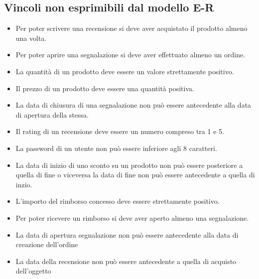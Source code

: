 \subsection{Vincoli non esprimibili dal modello E-R}

\begin{itemize}
    \item Per poter scrivere una recensione si deve aver acquistato il prodotto almeno una volta. 
    \item Per poter aprire una segnalazione si deve aver effettuato almeno un ordine.
    \item La quantità di un prodotto deve essere un valore strettamente positivo.
    \item Il prezzo di un prodotto deve essere una quantità positiva.
    \item La data di chiusura di una segnalazione non può essere antecedente alla data di apertura della stessa.
    \item Il rating di un recensione deve essere un numero compreso tra 1 e 5.
    \item La password di un utente non può essere inferiore agli 8 caratteri.
    \item La data di inizio di uno sconto su un prodotto non può essere posteriore a quella di fine o viceversa la data di fine non può essere antecedente a quella di inzio.
    \item L'importo del rimborso concesso deve essere strettamente positivo.
    \item Per poter ricevere un rimborso si deve aver aperto almeno una segnalazione.
    \item La data di apertura segnalazione non può essere antecedente alla data di creazione dell'ordine
    \item La data della recensione non può essere antecedente a quella di acquisto dell'oggetto
\end{itemize}